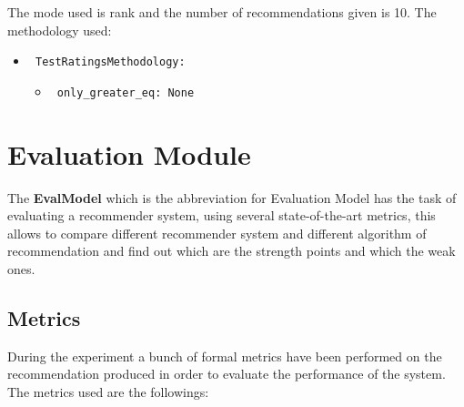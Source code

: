 \documentclass[11pt]{article}
\begin{document}
\hfill\break
The mode used is rank and the number of recommendations given
is 10.
The methodology used:
\begin{itemize}
    \item \verb| TestRatingsMethodology:|
    \begin{itemize}
                    \item \verb| only_greater_eq: None |
            \end{itemize}
\end{itemize}
\hfill\break



\hfill\break
\hfill\break



\section{Evaluation Module}\label{sec:eva-module}
The \textbf{EvalModel} which is the abbreviation for Evaluation Model has the task of evaluating a recommender system,
using several state-of-the-art metrics, this allows to compare different recommender system and different algorithm of
recommendation and find out which are the strength points and which the weak ones.

\subsection{Metrics}\label{subsec:metrics}
During the experiment a bunch of formal metrics have been performed on the recommendation produced in order to evaluate
the performance of the system.
The metrics used are the followings:
\hfill\break
\end{document}

